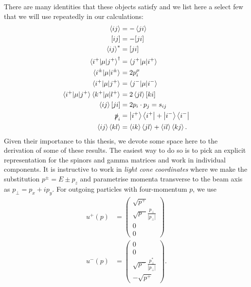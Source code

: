 There are many identities that these objects satisfy \cite{Dixon1996} and we list here a select few that we will use repeatedly in our calculations:
\begin{subequations}
\begin{align}
\left<i j \right> &= - \left<j i \right> \\
[i j] &= - [ji] \\
\left< i j \right>^* &= [j i ] \\
\mathinner{\langle i^+\vert\mu\vert j^+\rangle}_{}^\dagger &= \mathinner{\langle j^+\vert\mu\vert i^+\rangle}_{} \\
\mathinner{\langle i^\pm\vert\mu\vert i^\pm\rangle}_{} &= 2p_i^\mu \\
\mathinner{\langle i^+\vert\mu\vert j^+\rangle}_{} &= \mathinner{\langle j^-\vert\mu\vert i^-\rangle}_{} \\
\mathinner{\langle i^+\vert\mu\vert j^+\rangle}_{} \mathinner{\langle k^+\vert\mu\vert l^+\rangle}_{} &= 2 \left<j l \right> \left[k i \right] \\
 \left<i j \right> [ji] &= 2 p_i \cdot p_j = s_{ij} \\
\slashed{p}_i&= \left| i^+ \right> \left<i^+ \right| + \left|i^- \right> \left <i^- \right| \\
\left< i j \right> \left< k l \right> &= \left<i k \right> \left< j l \right> + \left< i l \right> \left< k j \right>.
\end{align}
\end{subequations}
Given their importance to this thesis, we devote some space here to the derivation of some of these results. The easiest way to do so is to pick an explicit representation for the spinors and gamma matrices and work in individual components. It is instructive to work in \emph{light cone coordinates} where we make the substitution $p^{\pm} = E \pm p_z$ and parametrise momenta transverse to the beam axis as $p_\perp = p_x + ip_y$. For outgoing particles with four-momentum $p$, we use
\begin{subequations}
\begin{align}
u^+(p) &= 
 \begin{pmatrix}
  \sqrt{p^+} \\
  \sqrt{p^-}\frac{p_{\perp}}{|p_{\perp}|}\\
  0 \\
  0
 \end{pmatrix}\\
 u^-(p) &= 
 \begin{pmatrix}
  0 \\
  0 \\
  \sqrt{p^-}\frac{p_{\perp}^*}{|p_{\perp}|} \\
  -\sqrt{p^+}
 \end{pmatrix}.
\end{align}
\end{subequations}
